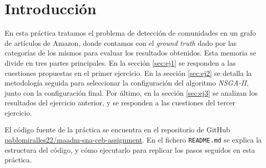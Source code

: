\section{Introducción}

En esta práctica tratamos el problema de detección de comunidades en un grafo
de artículos de Amazon, donde contamos con el \emph{ground truth} dado por las
categorías de los mismos para evaluar los resultados obtenidos. Esta memoria
se divide en tres partes principales. En la sección \ref{sec:ej1} se responden
a las cuestiones propuestas en el primer ejercicio. En la sección \ref{sec:ej2}
se detalla la metodología seguida para seleccionar la configuración del algoritmo
\emph{NSGA-II}, junto con la configuración final. Por último, en la sección
\ref{sec:ej3} se analizan los resultados del ejercicio anterior, y se responden
a las cuestiones del tercer ejercicio.

El código fuente de la práctica se encuentra en el repositorio de GitHub
\href{https://github.com/pablomiralles22/maadm-sna-ceb-assignment}{pablomiralles22/maadm-sna-ceb-assignment}. En el fichero \lstinline{README.md} se explica la estructura del
código, y cómo ejecutarlo para replicar los pasos seguidos en esta práctica.

